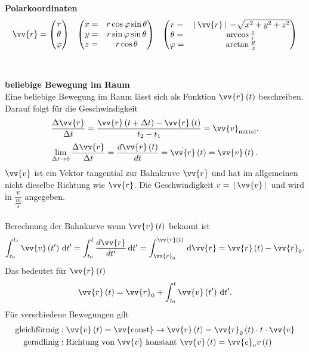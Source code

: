 \documentclass[a4paper,12pt]{article}
\newcommand{\td}{\,\text{d}}
\numberwithin{equation}{section}
\begin{document}
\\\hfill\\\textbf{Polarkoordinaten}\\ 
\begin{align*}
        \vv{r}=\left(\begin{matrix}
                r\\\theta \\\varphi
                \end{matrix}\right)&&\left(\begin{matrix}
                x=&r\cos \varphi \sin \theta \\
                y=&r\sin \varphi \sin \theta \\
                z=&r\cos \theta 
\end{matrix}\right)&&\left(\begin{matrix}
r=&\,|\, \vv{r}\,|\, =\sqrt[]{x^2+y^2+z^2}\\
\theta =&\arccos \tfrac{z}{r}\\
\varphi =&\arctan \tfrac{y}{x}
\end{matrix}\right)
\end{align*}
\\\hfill\\\textbf{beliebige Bewegung im Raum}\\ 
Eine beliebige Bewegung im Raum lässt sich als Funktion $\vv{r}\left(t\right)$ beschreiben. Darauf folgt für die Geschwindigkeit
\[ 
        \dfrac{\Delta \vv{r}}{\Delta t}=\dfrac{\vv{r}\left(t+\Delta t\right)-\vv{r}\left(t\right)}{t_2-t_1}={\vv{v}_{\text{mittel}} }
.\] 
\[ 
        \lim_{\Delta t\rightarrow 0}\dfrac{\Delta \vv{r}}{\Delta t}=\dfrac{d\vv{r}\left(t\right)}{dt}=\dot{\vv{r}}\left(t\right)=\vv{v}\left(t\right)
.\] 
$\vv{v}$ ist ein Vektor tangential zur Bahnkruve $\vv{r}$ und hat im allgemeinen nicht dieselbe Richtung wie $\vv{r}$. Die Geschwindigkeit $v=\,|\, \vv{v}\,|\, $ und wird in $\dfrac{v}{\tfrac{m}{s}}$ angegeben.\\\\
Berechnung der Bahnkurve wenn $\vv{v}\left(t\right)$ bekannt ist
\[ 
        \int_{t_0}^{t_1}\vv{v}\left(t'\right)\td t'=\int_{t_0}^{t}\dfrac{d\vv{r}}{dt'}\td t'=\int_{\vv{r}_0}^{\vv{r}\left(t\right)}\td\vv{r}=\vv{r}\left(t\right)-\vv{r}_0
.\] 
Das bedeutet für $\vv{r}\left(t\right)$
\[ 
        \vv{r}\left(t\right)=\vv{r}_0+\int_{t_0}^{t}\vv{v}\left(t'\right)\td t'
.\] 
Für verschiedene Bewegungen gilt
\begin{align*}
        \text{gleichförmig}&:\vv{v}\left(t\right)=\vv{\text{const}}\rightarrow \vv{r}\left(t\right)=\vv{r}_0\left(t\right)\cdot t\cdot \vv{v}\\
        \text{geradlinig}&:\text{Richtung von $\vv{v}$ konstant }\vv{v}\left(t\right)=\vv{e}_v v\left(t\right)
\end{align*}
\end{document}
